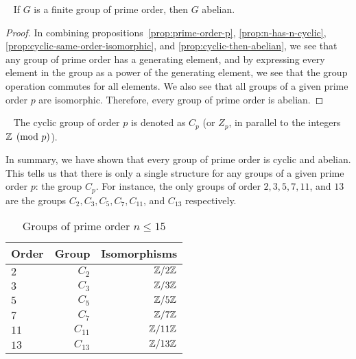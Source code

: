 \begin{corollary}~\label{cor:prime-then-abelian}
  If $G$ is a finite group of prime order, then $G$ abelian.
  \begin{proof}
    In combining propositions~\ref{prop:prime-order-p}, \ref{prop:n-has-n-cyclic},
    \ref{prop:cyclic-same-order-isomorphic}, and \ref{prop:cyclic-then-abelian},
    we see that any group of prime order has a generating element,
    and by expressing every element in the group as a power of the generating element,
    we see that the group operation commutes for all elements.
    We also see that all groups of a given prime order $p$ are isomorphic.
    Therefore, every group of prime order is abelian.
  \end{proof}
\end{corollary}

\begin{definition}~\label{def:C_n}
  The cyclic group of order $p$ is denoted as $C_p$ (or $Z_p$,
  in parallel to the integers $\mathbb{Z} \pmod p$).
\end{definition}

In summary, we have shown that every group of prime order is
cyclic and abelian. This tells us that there is only a single
structure for any groups of a given prime order $p$: the group $C_p$.
For instance, the only groups of order $2, 3, 5, 7, 11$, and $13$
are the groups $C_2, C_3, C_5, C_7, C_{11}$, and $C_{13}$ respectively.

\bigskip

\begin{center}
  \begin{table}[H]
    \begin{tabular}{ l r r }
      Order & Group & Isomorphisms \\
      \midrule
      $2$ & $C_2$ & $\mathbb{Z}/2\mathbb{Z}$ \\
      $3$ & $C_3$ & $\mathbb{Z}/3\mathbb{Z}$ \\
      $5$ & $C_5$ & $\mathbb{Z}/5\mathbb{Z}$ \\
      $7$ & $C_7$ & $\mathbb{Z}/7\mathbb{Z}$ \\
      $11$ & $C_{11}$ & $\mathbb{Z}/11\mathbb{Z}$ \\
      $13$ & $C_{13}$ & $\mathbb{Z}/13\mathbb{Z}$ \\
    \end{tabular}
    \caption{Groups of prime order $n \le 15$}~\label{tab:prime-groups}
  \end{table}
\end{center}
